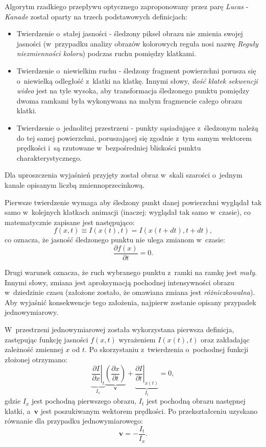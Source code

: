     \newpage
    Algorytm rzadkiego przepływu optycznego zaproponowany przez parę \textit{Lucas} - \textit{Kanade} został oparty na trzech podstawowych definicjach:
    \begin{itemize}
      \item Twierdzenie o~stałej jasności - śledzony piksel obrazu nie zmienia swojej jasności (w~przypadku analizy obrazów kolorowych reguła nosi nazwę \textit{Reguły niezmienności koloru}) podczas ruchu pomiędzy klatkami.
      \item Twierdzenie o~niewielkim ruchu - śledzony fragment powierzchni porusza się o~niewielką odległość z~klatki na klatkę. Innymi słowy, \textit{ilość klatek sekwencji wideo} jest na tyle wysoka, aby transformacja śledzonego punktu pomiędzy dwoma ramkami była wykonywana na małym fragmencie całego obrazu klatki.
      \item Twierdzenie o~jednolitej przestrzeni - punkty sąsiadujące z~śledzonym należą do tej samej powierzchni, poruszającej się zgodnie z~tym samym wektorem prędkości i~są rzutowane w~bezpośredniej bliskości punktu charakterystycznego.
    \end{itemize}

    Dla uproszczenia wyjaśnień przyjęty został obraz w~skali szarości o~jednym kanale opisanym liczbą zmiennoprzecinkową.

    Pierwsze twierdzenie wymaga aby śledzony punkt danej powierzchni wyglądał tak samo w~kolejnych klatkach animacji (inaczej: wyglądał tak samo w~czasie), co matematycznie zapisane jest następująco: \[ f(x, t) \equiv I(x(t), t) = I(x(t + dt), t + dt), \] co oznacza, że jasność śledzonego punktu nie ulega zmianom w~czasie: \[ \frac{\partial f(x)}{\partial t} = 0. \]

    Drugi warunek oznacza, że ruch wybranego punktu z~ramki na ramkę jest \textit{mały}. Innymi słowy, zmiana jest aproksymacją pochodnej intensywności obrazu w~dziedzinie czasu (założone zostało, że omawiana zmiana jest \textit{różniczkowalna}). Aby wyjaśnić konsekwencje tego założenia, najpierw zostanie opisany przypadek jednowymiarowy.

    W~przestrzeni jednowymiarowej została wykorzystana pierwsza definicja, zastępując funkcję jasności $f(x,t)$ wyrażeniem $I(x(t), t)$ oraz zakładając zależność zmiennej $x$ od $t$. Po skorzystaniu z~twierdzenia o~pochodnej funkcji złożonej otrzymano: \[ \underbrace{ \left. \frac{\partial I}{\partial x}\right|_{t} }_{I_{x}} \underbrace{ \left(\frac{\partial x}{\partial t}\right) }_{\mathbf{v}} + \underbrace{ \left. \frac{\partial I}{\partial t}\right|_{x(t)} }_{I_{t}} = 0, \] gdzie $I_{x}$ jest pochodną pierwszego obrazu, $I_{t}$ jest pochodną obrazu następnej klatki, a~$\mathbf{v}$ jest poszukiwanym wektorem prędkości. Po przekształceniu uzyskano równanie dla przypadku jednowymiarowego: \[ \mathbf{v} = -\frac{I_{t}}{I_{x}}. \]

